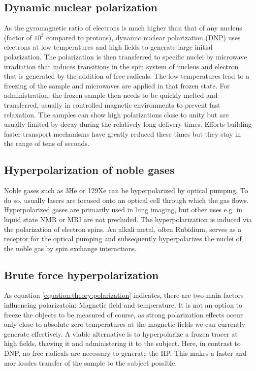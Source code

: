         \subsection{Dynamic nuclear polarization}
            As the gyromagnetic ratio of electrons is much higher than that of any nucleus (factor of $10^{3}$ compared to protons), dynamic nuclear polarization (DNP) uses electrons at low temperatures and high fields to generate large initial polarization. The polarization is then transferred to specific nuclei by microwave irradiation that induces transitions in the spin system of nucleus and electron that is generated by the addition of free radicals. The low temperatures lead to a freezing of the sample and microwaves are applied in that frozen state. For administration, the frozen sample then needs to be quickly melted and transferred, usually in controlled magnetic environments to prevent fast relaxation. The samples can show high polarizations close to unity but are usually limited by decay during the relatively long delivery times. Efforts building faster transport mechanisms have greatly reduced these times but they stay in the range of tens of seconds.
        \subsection{Hyperpolarization of noble gases}
            Noble gases such as 3He or 129Xe can be hyperpolarized by optical pumping. To do so, usually lasers are focused onto an optical cell through which the gas flows. Hyperpolarized gases are primarily used in lung imaging, but other uses e.g. in liquid state NMR or MRI are not precluded.
            The hyperpolarization is induced via the polarization of electron spins. An alkali metal, often Rubidium, serves as a receptor for the optical pumping and subsequently hyperpolarizes the nuclei of the noble gas by spin exchange interactions.
        \subsection{Brute force hyperpolarization}
            As equation \ref{equation:theory:polarization} indicates, there are two main factors influencing polarizatoin: Magnetic field and temperature. It is not an option to freeze the objects to be measured of course, as strong polarization effects occur only close to absolute zero temperatures at the magnetic fields we can currently generate effectively. A viable alternative is to hyperpolarize a frozen tracer at high fields, thawing it and administering it to the subject. Here, in contrast to DNP, no free radicals are necessary to generate the HP. This makes a faster and mor lossles transfer of the sample to the subject possible.

